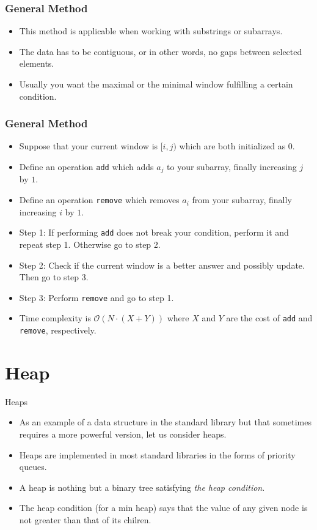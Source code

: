 \documentclass{beamer}
\begin{document}
\begin{frame}
    \frametitle{General Method}
    \begin{itemize}
        \item<1->  This method is applicable when working with substrings or subarrays.
        \item<2->  The data has to be contiguous, or in other words, no gaps between selected elements.
        \item<3->  Usually you want the maximal or the minimal window fulfilling a certain condition.
    \end{itemize}
\end{frame}

\begin{frame}
    \frametitle{General Method}
    \begin{itemize}
        \item<1->  Suppose that your current window is $[i, j)$ which are both initialized as $0$.
        \item<2->  Define an operation \texttt{add} which adds $a_j$ to your subarray, finally increasing $j$ by $1$.
        \item<3->  Define an operation \texttt{remove} which removes $a_i$ from your subarray, finally increasing $i$ by $1$.
        \item<4->  Step 1: If performing \texttt{add} does not break your condition, perform it and repeat step 1. Otherwise go to step 2.
        \item<5->  Step 2: Check if the current window is a better answer and possibly update. Then go to step 3.
        \item<6->  Step 3: Perform \texttt{remove} and go to step 1.
        \item<7-> Time complexity is $\mathcal{O}(N \cdot (X + Y))$ where $X$ and $Y$ are the cost of \texttt{add} and \texttt{remove}, respectively.
    \end{itemize}
\end{frame}

\section*{Heap}

\begin{frame}[plain]{Heaps}
    \begin{itemize}
        \item<1-> As an example of a data structure in the standard library but that sometimes requires a more powerful version, let us consider heaps.
        \item<2-> Heaps are implemented in most standard libraries in the forms of priority queues.
        \item<3-> A heap is nothing but a binary tree satisfying \textit{the heap condition}.
        \item<4-> The heap condition (for a min heap) says that the value of any given node is not greater than that of its chilren.
    \end{itemize}
\end{frame}
\end{document}
